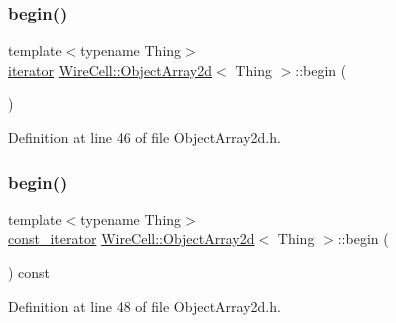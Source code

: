 \subsubsection{\texorpdfstring{begin()}{begin()}\hspace{0.1cm}{\footnotesize\ttfamily [1/2]}}
{\footnotesize\ttfamily template$<$typename Thing$>$ \\
\hyperlink{class_wire_cell_1_1_object_array2d_a08055a2eb80a3d4de9dcd72e5da07227}{iterator} \hyperlink{class_wire_cell_1_1_object_array2d}{Wire\+Cell\+::\+Object\+Array2d}$<$ Thing $>$\+::begin (\begin{DoxyParamCaption}{ }\end{DoxyParamCaption})\hspace{0.3cm}{\ttfamily [inline]}}



Definition at line 46 of file Object\+Array2d.\+h.

\mbox{\label{class_wire_cell_1_1_object_array2d_a662bd618ec32a52c93fe99a62f900a16}} 
\subsubsection{\texorpdfstring{begin()}{begin()}\hspace{0.1cm}{\footnotesize\ttfamily [2/2]}}
{\footnotesize\ttfamily template$<$typename Thing$>$ \\
\hyperlink{class_wire_cell_1_1_object_array2d_a4ac09025b41a1ab92f472eeae2cc0352}{const\+\_\+iterator} \hyperlink{class_wire_cell_1_1_object_array2d}{Wire\+Cell\+::\+Object\+Array2d}$<$ Thing $>$\+::begin (\begin{DoxyParamCaption}{ }\end{DoxyParamCaption}) const\hspace{0.3cm}{\ttfamily [inline]}}



Definition at line 48 of file Object\+Array2d.\+h.

\mbox{\label{class_wire_cell_1_1_object_array2d_a777fae88041cdb0086d801ff8099ede4}} 
